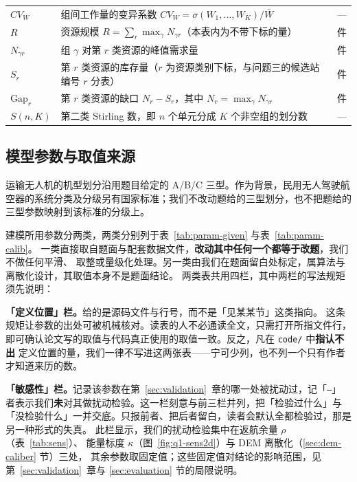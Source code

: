 \begin{table}[htbp]
\begin{tabularx}{\textwidth}{@{}l X l@{}}
		$CV_W$ & 组间工作量的变异系数 $CV_W=\sigma(W_1,\dots,W_K)/\bar W$ & --- \\
		$R$ & 资源规模 $R=\sum_r\max_\gamma N_{\gamma r}$（本表内为不带下标的量） & 件 \\
		$N_{\gamma r}$ & 组 $\gamma$ 对第 $r$ 类资源的峰值需求量 & 件 \\
		$S_r$ & 第 $r$ 类资源的库存量（$r$ 为资源类别下标，与问题三的候选站编号 $r$ 分表） & 件 \\
		$\mathrm{Gap}_r$ & 第 $r$ 类资源的缺口 $N_r-S_r$，其中 $N_r=\max_\gamma N_{\gamma r}$ & 件 \\
		$S(n,K)$ & 第二类 Stirling 数，即 $n$ 个单元分成 $K$ 个非空组的划分数 & --- \\
		\bottomrule
	\end{tabularx}
\end{table}

\subsection{模型参数与取值来源}
\label{sec:param-source}

运输无人机的机型划分沿用题目给定的 A/B/C 三型。作为背景，民用无人驾驶航空器的系统分类及分级另有国家标准\cite{samr2018uavclassification}；我们不改动题给的三型划分，也不把题给的三型参数映射到该标准的分级上。

建模所用参数分两类，两类分别列于表~\ref{tab:param-given} 与表~\ref{tab:param-calib}。
一类直接取自题面与配套数据文件，\textbf{改动其中任何一个都等于改题}，我们不做任何平滑、
取整或量级化处理。另一类由我们在题面留白处标定，属算法与离散化设计，其取值本身不是题面结论。
两类表共用四栏，其中两栏的写法规矩须先说明：

\textbf{「定义位置」栏。}给的是源码文件与行号，而不是「见某某节」这类指向。
这条规矩让参数的出处可被机械核对。读表的人不必通读全文，只需打开所指文件行，
即可确认论文写的取值与代码真正使用的取值一致。反之，凡在 \texttt{code/} 中\textbf{指认不出}
定义位置的量，我们一律不写进这两张表——宁可少列，也不列一个只有作者才知道来历的数。

\textbf{「敏感性」栏。}记录该参数在第~\ref{sec:validation}~章的哪一处被扰动过，记「\texttt{---}」
者表示我们\textbf{未}对其做扰动检验。这一栏刻意与前三栏并列，把「检验过什么」与
「没检验什么」一并交底。只报前者、把后者留白，读者会默认全都检验过，那是另一种形式的失真。
此栏显示，我们的扰动检验集中在返航余量 $\rho$（表~\ref{tab:sens}）、
能量标度 $\kappa$（图~\ref{fig:q1-sens2d}）与 DEM 离散化（\ref{sec:dem-caliber} 节）三处，
其余参数取固定值；这些固定值对结论的影响范围，见第~\ref{sec:validation}~章与 \ref{sec:evaluation} 节的局限说明。

